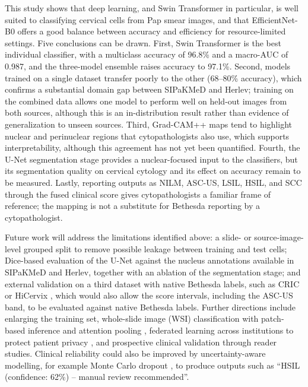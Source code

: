 \documentclass[runningheads]{llncs}
\begin{document}
This study shows that deep learning, and Swin Transformer in particular, is well suited to classifying cervical cells from Pap smear images, and that EfficientNet-B0 offers a good balance between accuracy and efficiency for resource-limited settings. Five conclusions can be drawn. First, Swin Transformer is the best individual classifier, with a multiclass accuracy of 96.8\% and a macro-AUC of 0.987, and the three-model ensemble raises accuracy to 97.1\%. Second, models trained on a single dataset transfer poorly to the other (68--80\% accuracy), which confirms a substantial domain gap between SIPaKMeD and Herlev; training on the combined data allows one model to perform well on held-out images from both sources, although this is an in-distribution result rather than evidence of generalization to unseen sources. Third, Grad-CAM++ maps tend to highlight nuclear and perinuclear regions that cytopathologists also use, which supports interpretability, although this agreement has not yet been quantified. Fourth, the U-Net segmentation stage provides a nuclear-focused input to the classifiers, but its segmentation quality on cervical cytology and its effect on accuracy remain to be measured. Lastly, reporting outputs as NILM, ASC-US, LSIL, HSIL, and SCC through the fused clinical score gives cytopathologists a familiar frame of reference; the mapping is not a substitute for Bethesda reporting by a cytopathologist.

Future work will address the limitations identified above: a slide- or source-image-level grouped split to remove possible leakage between training and test cells; Dice-based evaluation of the U-Net against the nucleus annotations available in SIPaKMeD and Herlev, together with an ablation of the segmentation stage; and external validation on a third dataset with native Bethesda labels, such as CRIC \cite{rezende2021cric} or HiCervix \cite{cai2024hicervix}, which would also allow the score intervals, including the ASC-US band, to be evaluated against native Bethesda labels. Further directions include enlarging the training set, whole-slide image (WSI) classification \cite{dang2023wsi} with patch-based inference and attention pooling \cite{ilse2018attention}, federated learning across institutions to protect patient privacy \cite{rieke2020federated}, and prospective clinical validation through reader studies. Clinical reliability could also be improved by uncertainty-aware modelling, for example Monte Carlo dropout \cite{gal2016dropout}, to produce outputs such as ``HSIL (confidence: 62\%) -- manual review recommended''.
\end{document}
